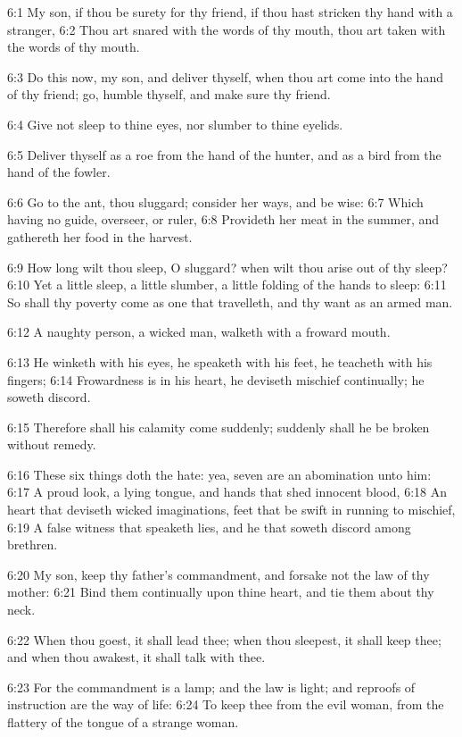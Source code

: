 6:1 My son, if thou be surety for thy friend, if thou hast stricken
thy hand with a stranger, 6:2 Thou art snared with the words of thy
mouth, thou art taken with the words of thy mouth.

6:3 Do this now, my son, and deliver thyself, when thou art come into
the hand of thy friend; go, humble thyself, and make sure thy friend.

6:4 Give not sleep to thine eyes, nor slumber to thine eyelids.

6:5 Deliver thyself as a roe from the hand of the hunter, and as a
bird from the hand of the fowler.

6:6 Go to the ant, thou sluggard; consider her ways, and be wise: 6:7
Which having no guide, overseer, or ruler, 6:8 Provideth her meat in
the summer, and gathereth her food in the harvest.

6:9 How long wilt thou sleep, O sluggard? when wilt thou arise out of
thy sleep?  6:10 Yet a little sleep, a little slumber, a little
folding of the hands to sleep: 6:11 So shall thy poverty come as one
that travelleth, and thy want as an armed man.

6:12 A naughty person, a wicked man, walketh with a froward mouth.

6:13 He winketh with his eyes, he speaketh with his feet, he teacheth
with his fingers; 6:14 Frowardness is in his heart, he deviseth
mischief continually; he soweth discord.

6:15 Therefore shall his calamity come suddenly; suddenly shall he be
broken without remedy.

6:16 These six things doth the \LORD hate: yea, seven are an
abomination unto him: 6:17 A proud look, a lying tongue, and hands
that shed innocent blood, 6:18 An heart that deviseth wicked
imaginations, feet that be swift in running to mischief, 6:19 A false
witness that speaketh lies, and he that soweth discord among brethren.

6:20 My son, keep thy father's commandment, and forsake not the law of
thy mother: 6:21 Bind them continually upon thine heart, and tie them
about thy neck.

6:22 When thou goest, it shall lead thee; when thou sleepest, it shall
keep thee; and when thou awakest, it shall talk with thee.

6:23 For the commandment is a lamp; and the law is light; and reproofs
of instruction are the way of life: 6:24 To keep thee from the evil
woman, from the flattery of the tongue of a strange woman.

